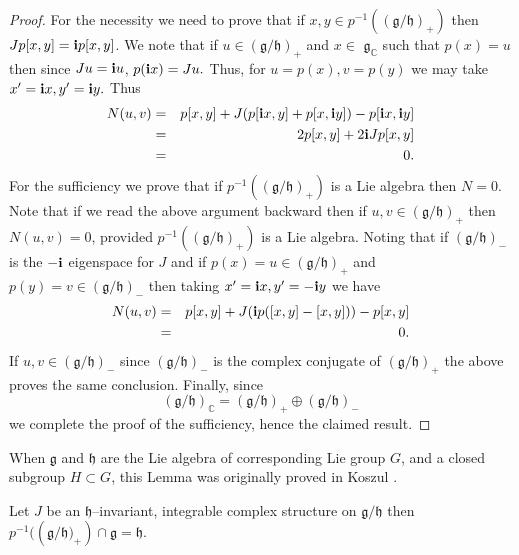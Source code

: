 \documentclass{amse-new}
\numberwithin{equation}{section} %
\begin{document}
\begin{proof}
For the necessity we need to prove that if $x,y\in p^{-1}\left(  \left(
\mathfrak{g}/\mathfrak{h}\right)  _{+}\right)  $ then $Jp[x,y]={\bf{i}}p[x,y]
$. We note that if $u\in\left(  \mathfrak{g}/\mathfrak{h}\right)  _{+}$ and
$x\in$ $\mathfrak{g}_{\mathbb{C}}$ such that $p(x)=u$ then since $Ju={\bf{i}}u$, $p({\bf{i}}x)=Ju. $ Thus, for $u=p(x),v=p(y)$ we may take $x^{\prime
}={\bf{i}}x,y^{\prime}={\bf{i}}y.$ Thus%
\begin{eqnarray*}
N(u, v)&=&p[x, y]+J(p[{\bf{i}}x, y]+p[x, {\bf{i}}y])-p[{\bf{i}}x, {\bf{i}}y]
\\
&=&2p[x, y]+2{\bf{i}}Jp[x, y]\\
&=&0.
\end{eqnarray*}
For the sufficiency we prove that if $p^{-1}(\left(  \mathfrak{g}%
/\mathfrak{h}\right)  _{+})$ is a Lie algebra then $N=0$. Note that if we read
the above argument backward then if $u,v\in\left(  \mathfrak{g}/\mathfrak{h}%
\right)  _{+} $ then $N(u,v)=0$, provided $p^{-1}(\left(  \mathfrak{g}/\mathfrak{h}%
\right)  _{+})$ is a Lie algebra. Noting that if $\left(  \mathfrak{g}%
/\mathfrak{h}\right)  _{-}$ is the $-{\bf{i}}$ eigenspace for $J$ and if
$p(x)=u\in\left(  \mathfrak{g}/\mathfrak{h}\right)  _{+}$ and $p(y)=v\in
\left(  \mathfrak{g}/\mathfrak{h}\right)  _{-}$ then taking $x^{\prime}%
={\bf{i}}x, y^{\prime}=-{\bf{i}}y$ we have
\begin{eqnarray*}
N(u,v)&=&p[x,y]+J({\bf{i}}p([x,y]-[x,y]))-p[x,y]\\
&=&0.
\end{eqnarray*}
If $u,v\in\left(  \mathfrak{g}/\mathfrak{h}\right)  _{-}$ since
$\left(  \mathfrak{g}/\mathfrak{h}\right)  _{-}$ is the complex conjugate of
$ \left(  \mathfrak{g}/\mathfrak{h}\right)  _{+}$ the above proves the same conclusion. Finally,
since \[
\left(  \mathfrak{g}/\mathfrak{h}\right)  _{\mathbb{C}}=\left(  \mathfrak{g}%
/\mathfrak{h}\right)  _{+}\oplus\left(  \mathfrak{g}/\mathfrak{h}\right)  _{-}%
\]
we complete the proof of the sufficiency, hence the claimed result.
\end{proof}

When $\mathfrak{g}$ and $\mathfrak{h}$ are the Lie algebra of corresponding
Lie group $G$, and a closed subgroup $H\subset G$, this Lemma was originally proved in  Koszul \cite{Kos}.




\begin{lemma}
\label{lmm:13} Let $J$ be an $\mathfrak{h}$--invariant, integrable complex
structure on $\mathfrak{g}/\mathfrak{h}$ then $p^{-1}((\mathfrak{g}%
/\mathfrak{h)}_{+})\cap\mathfrak{g=\mathfrak{h}}$.
\end{lemma}
\end{document}
